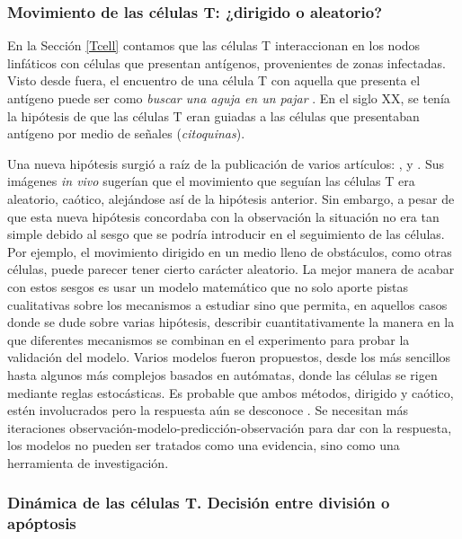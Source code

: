 \subsubsection{Movimiento de las células T: ¿dirigido o aleatorio?}

En la Sección \ref{Tcell} contamos que las células T interaccionan en los nodos linfáticos con células que presentan antígenos, provenientes de zonas infectadas. Visto desde fuera, el encuentro de una célula T con aquella que presenta el antígeno puede ser como \textit{buscar una aguja en un pajar} \citep{mathsModInmu}. En el siglo XX, se tenía la hipótesis de que las células T eran guiadas a las células que presentaban antígeno por medio de señales (\textit{citoquinas}). 

Una nueva hipótesis surgió a raíz de la publicación de varios artículos: \cite{Miller1869}, \cite{Stoll1873} y \cite{Bousso1876}. Sus imágenes \textit{in vivo} sugerían que el movimiento que seguían las células T era aleatorio, caótico, alejándose así de la hipótesis anterior. Sin embargo, a pesar de que esta nueva hipótesis concordaba con la observación la situación no era tan simple debido al sesgo que se podría introducir en el seguimiento de las células. Por ejemplo, el movimiento dirigido en un medio lleno de obstáculos, como otras células, puede parecer tener cierto carácter aleatorio. La mejor manera de acabar con estos sesgos es usar un modelo matemático que no solo aporte pistas cualitativas sobre los mecanismos a estudiar sino que permita, en aquellos casos donde se dude sobre varias hipótesis, describir cuantitativamente la manera en la que diferentes mecanismos se combinan en el experimento para probar la validación del modelo. 
Varios modelos fueron propuestos, desde los más sencillos hasta algunos más complejos basados en autómatas, donde las células se rigen mediante reglas estocásticas. Es probable que ambos métodos, dirigido y caótico, estén involucrados pero la respuesta aún se desconoce \citep{mathsModInmu}. Se necesitan más iteraciones observación-modelo-predicción-observación para dar con la respuesta, los modelos no pueden ser tratados como una evidencia, sino como una herramienta de investigación.

\subsubsection{Dinámica de las células T. Decisión entre división o apóptosis}

